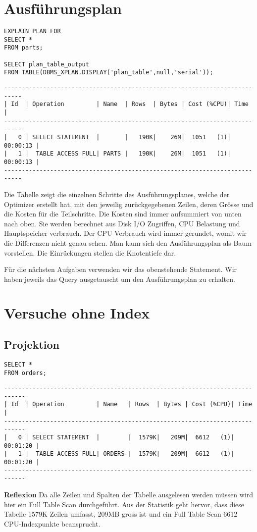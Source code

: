 \documentclass[10pt]{article}
\begin{document}
\section{Ausführungsplan}
\begin{lstlisting}[style=sql]
EXPLAIN PLAN FOR
SELECT *
FROM parts;

SELECT plan_table_output
FROM TABLE(DBMS_XPLAN.DISPLAY('plan_table',null,'serial'));
\end{lstlisting}
\begin{lstlisting}[style=queryexecutionplan]
---------------------------------------------------------------------------
| Id  | Operation         | Name  | Rows  | Bytes | Cost (%CPU)| Time     |
---------------------------------------------------------------------------
|   0 | SELECT STATEMENT  |       |   190K|    26M|  1051   (1)| 00:00:13 |
|   1 |  TABLE ACCESS FULL| PARTS |   190K|    26M|  1051   (1)| 00:00:13 |
---------------------------------------------------------------------------
\end{lstlisting}
Die Tabelle zeigt die einzelnen Schritte des Ausführungsplanes, welche der 
Optimizer erstellt hat, mit den jeweilig zurückgegebenen Zeilen, deren Grösse 
und die Kosten für die Teilschritte. Die Kosten sind immer aufsummiert von 
unten nach oben. Sie werden berechnet aus Disk I/O Zugriffen, CPU Belastung 
und Hauptspeicher verbrauch. Der CPU Verbrauch wird immer gerundet, womit 
wir die Differenzen nicht genau sehen.
Man kann sich den Ausführungsplan als Baum vorstellen. Die Einrückungen 
stellen die Knotentiefe dar.

Für die nächsten Aufgaben verwenden wir das obenstehende Statement. Wir 
haben jeweils das Query ausgetauscht um den Ausführungsplan zu erhalten.

\section{Versuche ohne Index}
\subsection{Projektion}
\begin{lstlisting}[style=sql]
SELECT *
FROM orders;
\end{lstlisting}
\begin{lstlisting}[style=queryexecutionplan]
----------------------------------------------------------------------------
| Id  | Operation         | Name   | Rows  | Bytes | Cost (%CPU)| Time     |
----------------------------------------------------------------------------
|   0 | SELECT STATEMENT  |        |  1579K|   209M|  6612   (1)| 00:01:20 |
|   1 |  TABLE ACCESS FULL| ORDERS |  1579K|   209M|  6612   (1)| 00:01:20 |
---------------------------------------------------------------------------- 
\end{lstlisting}   
\textbf{Reflexion} \newline
Da alle Zeilen und Spalten der Tabelle ausgelesen werden müssen wird hier ein
Full Table Scan durchgeführt. Aus der Statistik geht hervor, dass diese Tabelle
1579K Zeilen umfasst, 209MB gross ist und ein Full Table Scan 6612 CPU-Indexpunkte
beansprucht.
\end{document}
